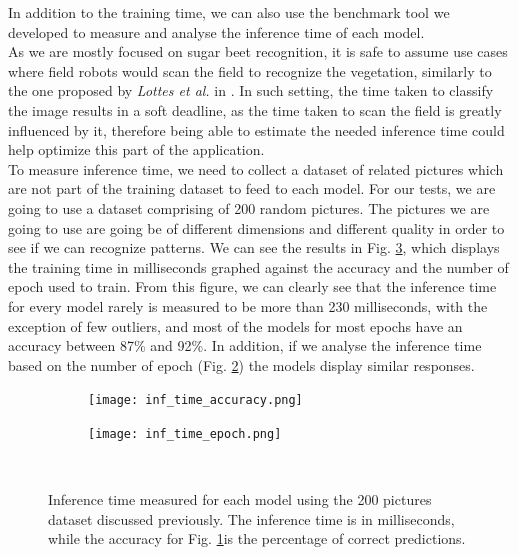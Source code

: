 In addition to the training time, we can also use the benchmark tool we developed to measure and analyse the inference time of each model.\\
As we are mostly focused on sugar beet recognition, it is safe to assume use cases where field robots would scan the field to recognize the vegetation, similarly to the one proposed by \textit{Lottes et al.} in \cite{7487720}. In such setting, the time taken to classify the image results in a soft deadline, as the time taken to scan the field is greatly influenced by it, therefore being able to estimate the needed inference time could help optimize this part of the application. \\
To measure inference time, we need to collect a dataset of related pictures which are not part of the training dataset to feed to each model. For our tests, we are going to use a dataset comprising of 200 random pictures. The pictures we are going to use are going be of different dimensions and different quality in order to see if we can recognize patterns. We can see the results in Fig. \ref{fig:inf_time_epoch_c}, which displays the training time in milliseconds graphed against the accuracy and the number of epoch used to train. From this figure, we can clearly see that the inference time for every model rarely is measured to be more than 230 milliseconds, with the exception of few outliers, and most of the models for most epochs have an accuracy between 87\% and 92\%. In addition, if we analyse the inference time based on the number of epoch (Fig. \ref{fig:inf_time_epoch}) the models display similar responses.  \\


\begin{figure}[h]
     \begin{subfigure}{0.5\textwidth}
	    \texttt{[image: inf\_time\_accuracy.png]}
	    \caption{}
         \label{fig:inf_time_accuracy}
     \end{subfigure}
     \hfill
     \begin{subfigure}{0.5\textwidth}
	    \texttt{[image: inf\_time\_epoch.png]}
	    \caption{}
        \label{fig:inf_time_epoch}
     \end{subfigure}\\
     \caption[Inference time measured for each model]{Inference time measured for each model using the 200 pictures dataset discussed previously. The inference time is in milliseconds, while the accuracy for Fig. \ref{fig:inf_time_accuracy}is the percentage of correct predictions.}
        \label{fig:inf_time_epoch_c}
\end{figure}

